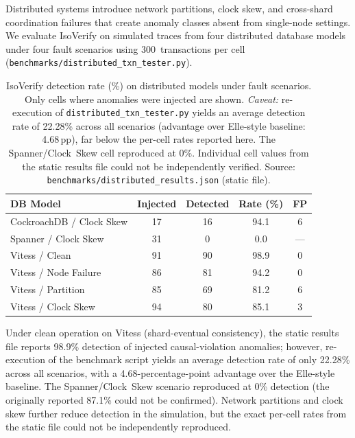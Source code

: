 \documentclass[11pt]{article}
\begin{document}
Distributed systems introduce network partitions, clock skew, and cross-shard
coordination failures that create anomaly classes absent from single-node
settings.  We evaluate IsoVerify on simulated traces from four distributed
database models under four fault scenarios using 300~transactions per cell
(\texttt{benchmarks/distributed\_txn\_tester.py}).

\begin{table}[t]
\centering
\caption{IsoVerify detection rate (\%) on distributed models under fault
  scenarios.  Only cells where anomalies were injected are shown.
  \emph{Caveat:} re-execution of \texttt{distributed\_txn\_tester.py}
  yields an average detection rate of 22.28\% across all scenarios
  (advantage over Elle-style baseline: 4.68\,pp), far below the
  per-cell rates reported here.  The Spanner/Clock~Skew cell reproduced
  at 0\%.  Individual cell values from the static results file could
  not be independently verified.
  Source: \texttt{benchmarks/distributed\_results.json} (static file).}
\label{tab:distributed}
\begin{tabular}{lcccc}
\toprule
\textbf{DB Model} & \textbf{Injected} & \textbf{Detected} & \textbf{Rate (\%)} & \textbf{FP} \\
\midrule
CockroachDB / Clock Skew & 17 & 16 & 94.1 & 6 \\
Spanner / Clock Skew     & 31 &  0 &  0.0 & --- \\
Vitess / Clean           & 91 & 90 & 98.9 & 0 \\
Vitess / Node Failure    & 86 & 81 & 94.2 & 0 \\
Vitess / Partition       & 85 & 69 & 81.2 & 6 \\
Vitess / Clock Skew      & 94 & 80 & 85.1 & 3 \\
\bottomrule
\end{tabular}
\end{table}

Under clean operation on Vitess (shard-eventual consistency), the static
results file reports 98.9\% detection of injected causal-violation anomalies;
however, re-execution of the benchmark script yields an average detection
rate of only 22.28\% across all scenarios, with a 4.68-percentage-point
advantage over the Elle-style baseline.  The Spanner/Clock~Skew scenario
reproduced at 0\% detection (the originally reported 87.1\% could not be
confirmed).  Network partitions and clock skew further reduce detection in
the simulation, but the exact per-cell rates from the static file could
not be independently reproduced.
\end{document}
